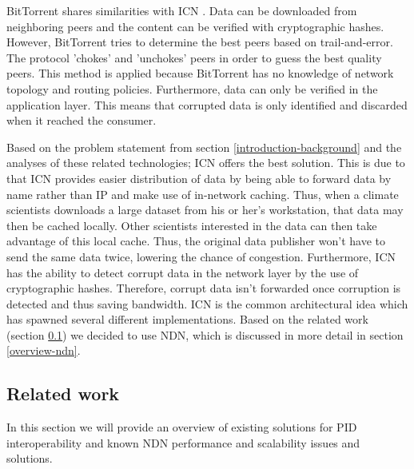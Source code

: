 BitTorrent shares similarities with ICN \cite{mastorakis2017ntorrent}. Data can be downloaded from neighboring peers and the content can be verified with cryptographic hashes. However, BitTorrent tries to determine the best peers based on trail-and-error. The protocol 'chokes' and 'unchokes' peers in order to guess the best quality peers. This method is applied because BitTorrent has no knowledge of network topology and routing policies. Furthermore, data can only be verified in the application layer. This means that corrupted data is only identified and discarded when it reached the consumer. 

Based on the problem statement from section \ref{introduction-background} and the analyses of these related technologies; ICN offers the best solution. This is due to that ICN provides easier distribution of data by being able to forward data by name rather than IP and make use of in-network caching. Thus, when a climate scientists downloads a large dataset from his or her's workstation, that data may then be cached locally. Other scientists interested in the data can then take advantage of this local cache. Thus, the original data publisher won't have to send the same data twice, lowering the chance of congestion. Furthermore, ICN has the ability to detect corrupt data in the network layer by the use of cryptographic hashes. Therefore, corrupt data isn't forwarded once corruption is detected and thus saving bandwidth. ICN is the common architectural idea which has spawned several different implementations. Based on the related work (section \ref{introduction-related-work}) we decided to use NDN, which is discussed in more detail in section \ref{overview-ndn}.

\subsection{Related work}
\label{introduction-related-work}


In this section we will provide an overview of existing solutions for PID interoperability and known NDN performance and scalability issues and solutions.

